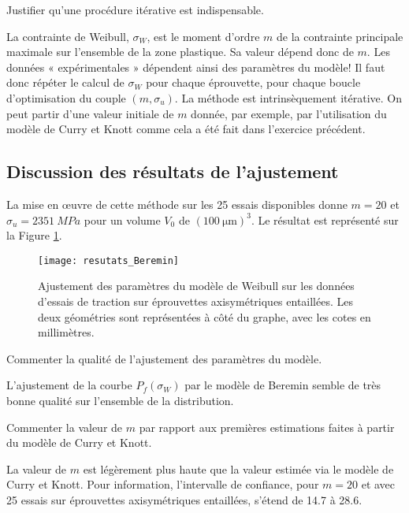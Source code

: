\begin{questions}
\question Justifier qu’une procédure itérative est indispensable.
\begin{solution}
La contrainte de Weibull, $\sigma_W$, est le moment d’ordre $m$ de la contrainte principale maximale sur l’ensemble de la zone plastique. Sa valeur dépend donc de $m$. Les données « expérimentales » dépendent ainsi des paramètres du modèle! Il faut donc répéter le calcul de $\sigma_W$ pour chaque éprouvette, pour chaque boucle d’optimisation du couple $(m,\sigma_u)$. La méthode est intrinsèquement itérative. On peut partir d’une valeur initiale de $m$ donnée, par exemple, par l’utilisation du modèle de Curry et Knott comme cela a été fait dans l’exercice précédent. 
\end{solution}

\subsection{Discussion des résultats de l’ajustement}
La mise en \oe{}uvre de cette méthode sur les 25 essais disponibles donne $m=20$ et $\sigma_u=\SI{2351}{MPa}$ pour
un volume $V_0$ de $(\SI{100}{\micro\meter})^3$. Le résultat est représenté sur la Figure \ref{fig:Beremin-results}.
\begin{figure}
\begin{center}
\texttt{[image: resutats\_Beremin]}
\end{center}
\caption{Ajustement des paramètres du modèle de Weibull sur les données d’essais de traction sur
éprouvettes axisymétriques entaillées. Les deux géométries sont représentées à côté du graphe, avec
les cotes en millimètres.}\label{fig:Beremin-results}
\end{figure}

\question Commenter la qualité de l’ajustement des paramètres du modèle.
\begin{solution}
L'ajustement de la courbe $P_f(\sigma_W)$ par le modèle de Beremin semble de très bonne qualité sur l’ensemble de la distribution.
\end{solution}

\question Commenter la valeur de $m$ par rapport aux premières estimations faites à partir du modèle de Curry et Knott.
\begin{solution}
La valeur de $m$ est légèrement plus haute que la valeur estimée via le modèle de Curry et
Knott. Pour information, l’intervalle de confiance, pour $m= 20$ et avec 25 essais sur éprouvettes axisymétriques entaillées, s’étend de 14.7 à 28.6.
\end{solution}


\end{questions}
